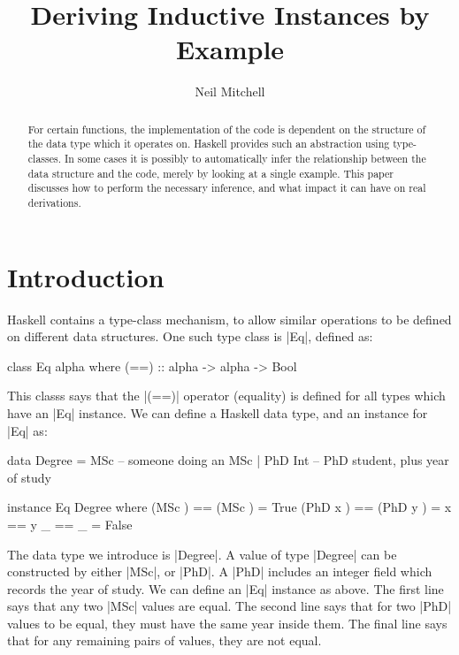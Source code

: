 \documentclass{llncs}
\begin{document}
\title{Deriving Inductive Instances by Example}
\author{Neil Mitchell}


\maketitle

\begin{abstract}
For certain functions, the implementation of the code is dependent on the structure of the data type which it operates on. Haskell provides such an abstraction using type-classes. In some cases it is possibly to automatically infer the relationship between the data structure and the code, merely by looking at a single example. This paper discusses how to perform the necessary inference, and what impact it can have on real derivations.
\end{abstract}

\section{Introduction}

Haskell contains a type-class mechanism, to allow similar operations to be defined on different data structures. One such type class is |Eq|, defined as:

\begin{code}
class Eq alpha where
    (==) :: alpha -> alpha -> Bool
\end{code}

This classs says that the |(==)| operator (equality) is defined for all types which have an |Eq| instance. We can define a Haskell data type, and an instance for |Eq| as:

\begin{code}
data Degree  =  MSc        -- someone doing an MSc
             |  PhD Int    -- PhD student, plus year of study

instance Eq Degree where
    (MSc    )  == (MSc    )  = True
    (PhD x  )  == (PhD y  )  = x == y
    _          == _          = False
\end{code}

The data type we introduce is |Degree|. A value of type |Degree| can be constructed by either |MSc|, or |PhD|. A |PhD| includes an integer field which records the year of study. We can define an |Eq| instance as above. The first line says that any two |MSc| values are equal. The second line says that for two |PhD| values to be equal, they must have the same year inside them. The final line says that for any remaining pairs of values, they are not equal.
\end{document}
